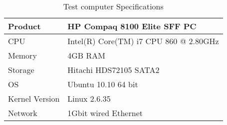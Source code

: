 \begin{table}[!h]
    \centering
    \caption{Test computer Specifications}
    \label{tab:hwbf}
    \begin{tabular}{| l | l |}
	\hline
	Product		        &HP Compaq 8100 Elite SFF PC \\
	\hline
	CPU		            &Intel(R) Core(TM) i7 CPU 860 @ 2.80GHz\\
	\hline
	Memory	            &4GB \ac{RAM}\\
	\hline
    Storage             &Hitachi HDS72105 SATA2 \\
	\hline
    OS		            &Ubuntu 10.10 64 bit\\
	\hline
	Kernel Version	    &Linux 2.6.35\\
	\hline
    Network             &1Gbit wired Ethernet \\
    \hline
    \end{tabular}
\end{table}
